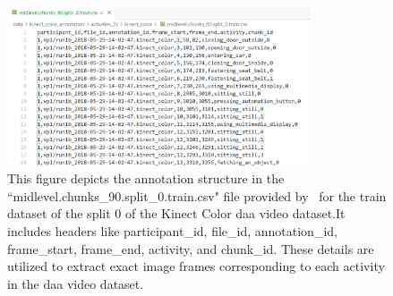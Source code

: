 \begin{figure}[h]
\begin{center}
\includegraphics[width=0.8\textwidth]{Images_Thesis/annotation_example.png}
\end{center}
\caption[Example of an annotations file.]{This figure depicts the annotation structure in the ``midlevel.chunks\_90.split\_0.train.csv" file provided by~\citet{martin2019drive_and_act_2019_iccv} for the train dataset of the split 0 of the Kinect Color \gls{daa} video dataset.It includes headers like participant\_id, file\_id, annotation\_id, frame\_start, frame\_end, activity, and chunk\_id. These details are utilized to extract exact image frames corresponding to each activity in the \gls{daa} video dataset.}
\label{fig:example of an annotation file}
\end{figure}

